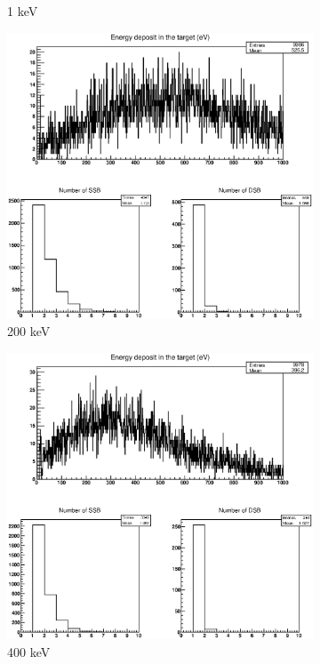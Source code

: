 \begin{figure}
\begin{subfigure}{.5\textwidth}
  \caption{1 keV}
  \label{fig:sub5}
\end{subfigure}%
\begin{subfigure}{.5\textwidth}
  \centering
  \includegraphics[width=.78\linewidth]{./Figures/1zbbp200kev.eps}
  \caption{200 keV}
  \label{fig:sub6}
\end{subfigure}
\begin{subfigure}{.5\textwidth}
  \centering
  \includegraphics[width=.78\linewidth]{./Figures/1zbbp400kev.eps}
  \caption{400 keV}
  \label{fig:sub7}
\end{subfigure}%
\begin{subfigure}{.5\textwidth}
  \centering

\end{subfigure}
\end{figure}
